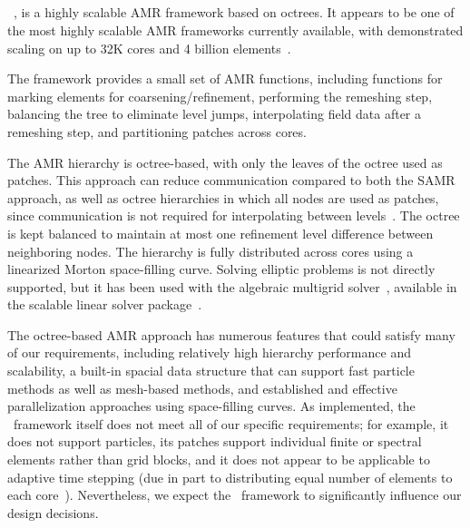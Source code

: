 \documentclass[10pt,twocolumn]{article}
\begin{document}
\subsection{\alps } \label{ss:alps}

\alps~\cite{BuBu09}, is a highly scalable AMR framework based on
octrees.  It appears to be one of the most highly scalable AMR
frameworks currently available, with demonstrated scaling on up to 32K
cores and 4 billion elements~\cite{BuGh08}.

The framework provides a small set of AMR functions, including
functions for marking elements for coarsening/refinement, performing
the remeshing step, balancing the tree to eliminate level jumps,
interpolating field data after a remeshing step, and partitioning 
patches across cores.

The AMR hierarchy is octree-based, with only the leaves of the octree
used as patches.  This approach can reduce communication compared to
both the SAMR approach, as well as octree hierarchies in which all
nodes are used as patches, since communication is not required for
interpolating between levels~\cite{BuGh08b}.  The octree is kept
balanced to maintain at most one refinement level difference between
neighboring nodes.  The hierarchy is fully distributed across cores
using a linearized Morton space-filling curve.  Solving
elliptic problems is not directly supported, but it has been used with
the  algebraic multigrid solver~\cite{HeYa02},
available in the  scalable linear solver
package~\cite{FaJo06}.

The octree-based AMR approach has numerous features that could satisfy
many of our requirements, including relatively high hierarchy
performance and scalability, a built-in spacial data structure that
can support fast particle methods as well as mesh-based methods, and
established and effective parallelization approaches using
space-filling curves.  As implemented, the \alps\ framework itself
does not meet all of our specific requirements; for example, it does
not support particles, its patches support individual finite or
spectral elements rather than grid blocks, and it does not appear to
be applicable to adaptive time stepping (due in part to distributing
equal number of elements to each core~\cite{BuGh08b}).  Nevertheless,
we expect the \alps\ framework to significantly influence our design
decisions.
\end{document}
